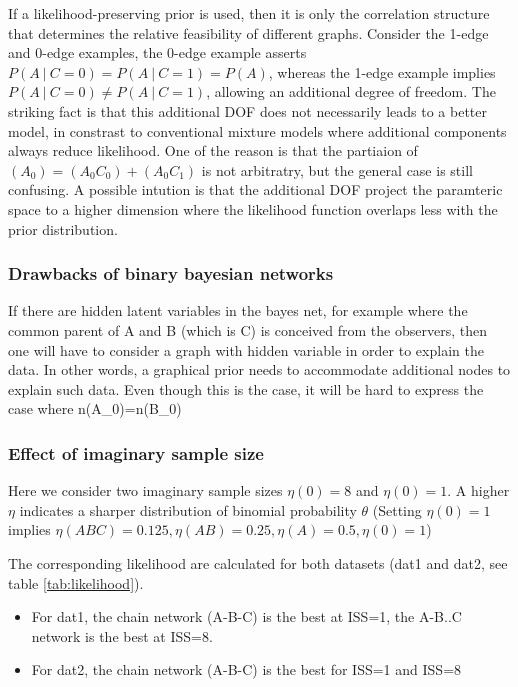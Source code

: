 \documentclass[]{article}
\newcommand\gvn[1][]{\:#1\vert\:}
\theoremstyle{definition}
\theoremstyle{definition}
\theoremstyle{definition}
\theoremstyle{remark}
\begin{document}
If a likelihood-preserving prior is used, then it is only the
correlation structure that determines the relative feasibility of
different graphs. Consider the 1-edge and 0-edge examples, the 0-edge
example asserts \(P(A\gvn C=0)=P(A\gvn C=1)=P(A)\), whereas the 1-edge
example implies \(P(A\gvn C=0)\neq P(A\gvn C=1)\), allowing an
additional degree of freedom. The striking fact is that this additional
DOF does not necessarily leads to a better model, in constrast to
conventional mixture models where additional components always reduce
likelihood. One of the reason is that the partiaion of
\((A_0)=(A_0C_0)+(A_0C_1)\) is not arbitratry, but the general case is
still confusing. A possible intution is that the additional DOF project
the paramteric space to a higher dimension where the likelihood function
overlaps less with the prior distribution.

\subsubsection{Drawbacks of binary bayesian
networks}\label{drawbacks-of-binary-bayesian-networks}

If there are hidden latent variables in the bayes net, for example where
the common parent of A and B (which is C) is conceived from the
observers, then one will have to consider a graph with hidden variable
in order to explain the data. In other words, a graphical prior needs to
accommodate additional nodes to explain such data. Even though this is
the case, it will be hard to express the case where n(A\_0)=n(B\_0)

\subsubsection{Effect of imaginary sample
size}\label{effect-of-imaginary-sample-size}

Here we consider two imaginary sample sizes \(\eta(0)=8\) and
\(\eta(0)=1\). A higher \(\eta\) indicates a sharper distribution of
binomial probability \(\theta\) (Setting \(\eta(0)=1\) implies
\(\eta(ABC)=0.125,\eta(AB)=0.25,\eta(A)=0.5,\eta(0)=1\))

The corresponding likelihood are calculated for both datasets (dat1 and
dat2, see table \ref{tab:likelihood}).

\begin{itemize}
\item
  For dat1, the chain network (A-B-C) is the best at ISS=1, the A-B..C
  network is the best at ISS=8.
\item
  For dat2, the chain network (A-B-C) is the best for ISS=1 and ISS=8
\end{itemize}
\end{document}
